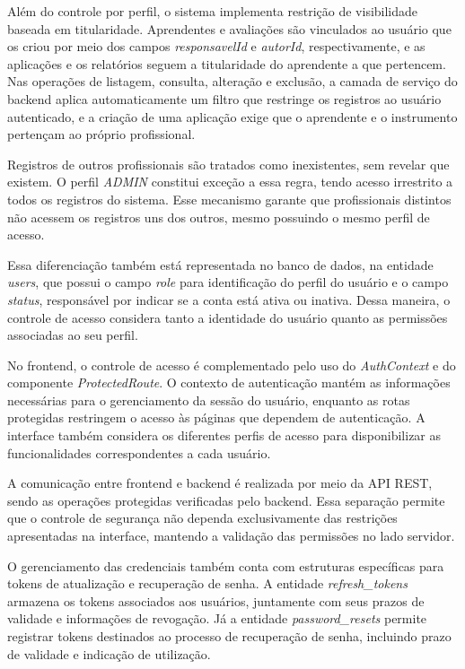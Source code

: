 Além do controle por perfil, o sistema implementa restrição de visibilidade baseada em titularidade. Aprendentes e avaliações são vinculados ao usuário que os criou por meio dos campos \textit{responsavelId} e \textit{autorId}, respectivamente, e as aplicações e os relatórios seguem a titularidade do aprendente a que pertencem. Nas operações de listagem, consulta, alteração e exclusão, a camada de serviço do backend aplica automaticamente um filtro que restringe os registros ao usuário autenticado, e a criação de uma aplicação exige que o aprendente e o instrumento pertençam ao próprio profissional. 

Registros de outros profissionais são tratados como inexistentes, sem revelar que existem. O perfil \textit{ADMIN} constitui exceção a essa regra, tendo acesso irrestrito a todos os registros do sistema. Esse mecanismo garante que profissionais distintos não acessem os registros uns dos outros, mesmo possuindo o mesmo perfil de acesso.

Essa diferenciação também está representada no banco de dados, na entidade \textit{users}, que possui o campo \textit{role} para identificação do perfil do usuário e o campo \textit{status}, responsável por indicar se a conta está ativa ou inativa. Dessa maneira, o controle de acesso considera tanto a identidade do usuário quanto as permissões associadas ao seu perfil.

No frontend, o controle de acesso é complementado pelo uso do \textit{AuthContext} e do componente \textit{ProtectedRoute}. O contexto de autenticação mantém as informações necessárias para o gerenciamento da sessão do usuário, enquanto as rotas protegidas restringem o acesso às páginas que dependem de autenticação. A interface também considera os diferentes perfis de acesso para disponibilizar as funcionalidades correspondentes a cada usuário.

A comunicação entre frontend e backend é realizada por meio da API REST, sendo as operações protegidas verificadas pelo backend. Essa separação permite que o controle de segurança não dependa exclusivamente das restrições apresentadas na interface, mantendo a validação das permissões no lado servidor.

O gerenciamento das credenciais também conta com estruturas específicas para tokens de atualização e recuperação de senha. A entidade \textit{refresh\_tokens} armazena os tokens associados aos usuários, juntamente com seus prazos de validade e informações de revogação. Já a entidade \textit{password\_resets} permite registrar tokens destinados ao processo de recuperação de senha, incluindo prazo de validade e indicação de utilização.

